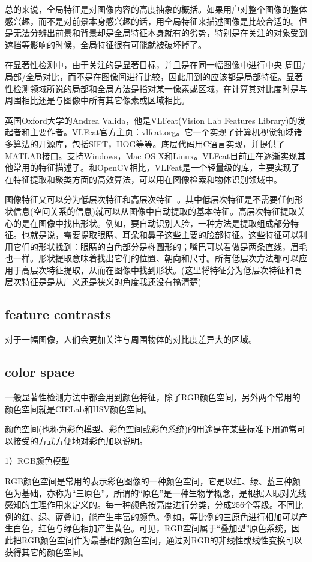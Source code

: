 \documentclass[12pt]{article}
\begin{document}
总的来说，全局特征是对图像内容的高度抽象的概括。如果用户对整个图像的整体感兴趣，而不是对前景本身感兴趣的话，用全局特征来描述图像是比较合适的。但是无法分辨出前景和背景却是全局特征本身就有的劣势，特别是在关注的对象受到遮挡等影响的时候，全局特征很有可能就被破坏掉了。

在显著性检测中，由于关注的是显著目标，并且是在同一幅图像中进行中央-周围/局部/全局对比，而不是在图像间进行比较，因此用到的应该都是局部特征。显著性检测领域所说的局部和全局方法是指对某一像素或区域，在计算其对比度时是与周围相比还是与图像中所有其它像素或区域相比。

英国Oxford大学的Andrea Valida，他是VLFeat(Vision Lab Features Library)的发起者和主要作者。VLFeat官方主页：\url{vlfeat.org}。它一个实现了计算机视觉领域诸多算法的开源库，包括SIFT，HOG等等。底层代码用C语言实现，并提供了MATLAB接口。支持Windows，Mac OS X和Linux。VLFeat目前正在逐渐实现其他常用的特征描述子。和OpenCV相比，VLFeat是一个轻量级的库，主要实现了在特征提取和聚类方面的高效算法，可以用在图像检索和物体识别领域中。

图像特征又可以分为低层次特征和高层次特征~\cite{nixon2012feature}。其中低层次特征是不需要任何形状信息(空间关系的信息)就可以从图像中自动提取的基本特征。高层次特征提取关心的是在图像中找出形状。例如，要自动识别人脸，一种方法是提取组成部分特征。也就是说，需要提取眼睛、耳朵和鼻子这些主要的脸部特征。这些特征可以利用它们的形状找到：眼睛的白色部分是椭圆形的；嘴巴可以看做是两条直线，眉毛也一样。形状提取意味着找出它们的位置、朝向和尺寸。所有低层次方法都可以应用于高层次特征提取，从而在图像中找到形状。(这里将特征分为低层次特征和高层次特征是是从广义还是狭义的角度我还没有搞清楚)

\subsection{feature contrasts}

对于一幅图像，人们会更加关注与周围物体的对比度差异大的区域。

\subsection{color space}

一般显著性检测方法中都会用到颜色特征，除了RGB颜色空间，另外两个常用的颜色空间就是CIELab和HSV颜色空间。

颜色空间(也称为彩色模型、彩色空间或彩色系统)的用途是在某些标准下用通常可以接受的方式方便地对彩色加以说明。

1）RGB颜色模型

RGB颜色空间是常用的表示彩色图像的一种颜色空间，它是以红、绿、蓝三种颜色为基础，亦称为“三原色”。所谓的“原色”是一种生物学概念，是根据人眼对光线感知的生理作用来定义的。每一种颜色按亮度进行分类，分成256个等级。不同比例的红、绿、蓝叠加，能产生丰富的颜色。例如，等比例的三原色进行相加可以产生白色，红色与绿色相加产生黄色。可见，RGB空间属于“叠加型”原色系统，因此把RGB颜色空间作为最基础的颜色空间，通过对RGB的非线性或线性变换可以获得其它的颜色空间。
\end{document}
